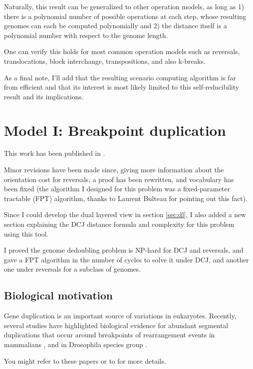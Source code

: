 \documentclass[11pt,final,twoside,nofrench]{thlifl}
\begin{document}
Naturally, this result can be generalized to other operation models, as long as 1) there is a polynomial number of possible operations at each step, whose resulting genomes can each be computed polynomially and 2) the distance itself is a polynomial number with respect to the genome length.

One can verify this holds for most common operation models such as reversals, translocations, block interchange, transpositions, and also k-breaks.

As a final note, I'll add that the resulting scenario computing algorithm is far from efficient and that its interest is most likely limited to this self-reducibility result and its implications.

\section{Model I: Breakpoint duplication}

This work has been published in \cite{Thomas11}.

Minor revisions have been made since, giving more information about the orientation cost for reversals, a proof has been rewritten, and vocabulary has been fixed (the algorithm I designed for this problem was a fixed-parameter tractable (FPT) algorithm, thanks to Laurent Bulteau for pointing out this fact).

Since I could develop the dual layered view in section \ref{sec:dl}, I also added a new section explaining the DCJ distance formula and complexity for this problem using this tool.

I proved the genome dedoubling problem is NP-hard for DCJ and reversals, and gave a FPT algorithm in the number of cycles to solve it under DCJ, and another one under reversals for a subclass of genomes.

\subsection{Biological motivation}

Gene duplication is an important source of variations in eukaryotes.
Recently, several studies have highlighted biological evidence for 
abundant segmental duplications that occur around breakpoints of 
rearrangement events in mammalians \cite{B04, D11}, and in Drosophila species group \cite{R07} \cite{M05} \cite{R05} \cite{M09}.

You might refer to these papers or to \cite{Thomas11} for more details.
\end{document}
